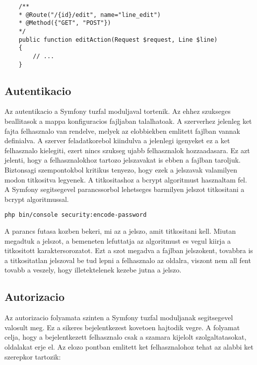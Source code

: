 \begin{lstlisting}
    /**
    * @Route("/{id}/edit", name="line_edit")
    * @Method({"GET", "POST"})
    */
    public function editAction(Request $request, Line $line)
    {
        // ...
    }
\end{lstlisting}

\subsection*{Autentikacio}
\label{authentication}

Az autentikacio a Symfony tuzfal moduljaval tortenik. 
Az ehhez szukseges beallitasok a  mappa  konfiguracios fajljaban talalhatoak. 
A szerverhez jelenleg ket fajta felhasznalo van rendelve, melyek az elobbiekben emlitett fajlban vannak definialva.
A szerver feladatkorebol kiindulva a jelenlegi igenyeket ez a ket felhasznalo kielegiti, ezert nincs szukseg ujabb felhasznalok hozzaadasara. 
Ez azt jelenti, hogy a felhasznalokhoz tartozo jelszavakat is ebben a fajlban taroljuk. 
Biztonsagi szempontokbol kritikus tenyezo, hogy ezek a jelszavak valamilyen modon titkositva legyenek. 
A titkositashoz a bcrypt algoritmust hasznaltam fel. 
A Symfony segitsegevel parancssorbol lehetseges barmilyen jelszot titkositani a bcrypt algoritmussal. 

\begin{lstlisting}
php bin/console security:encode-password
\end{lstlisting}

A parancs futasa kozben bekeri, mi az a jelszo, amit titkositani kell. 
Miutan megadtuk a jelszot, a bemeneten lefuttatja az algoritmust es vegul kiirja a titkositott karaktersorozatot. 
Ezt a szot megadva a fajlban jelszokent, tovabbra is a titkositatlan jelszoval be tud lepni a felhasznalo az oldalra, viszont nem all fent tovabb a veszely, hogy illetektelenek kezebe jutna a jelszo. %

\subsection*{Autorizacio}
\label{authorization}

Az autorizacio folyamata szinten a Symfony tuzfal moduljanak segitsegevel valosult meg. 
Ez a sikeres bejelentkezest kovetoen hajtodik vegre. 
A folyamat celja, hogy a bejelentkezett felhasznalo csak a szamara kijelolt szolgaltatasokat, oldalakat erje el. 
Az elozo pontban emlitett ket felhasznalohoz tehat az alabbi ket szerepkor tartozik:

